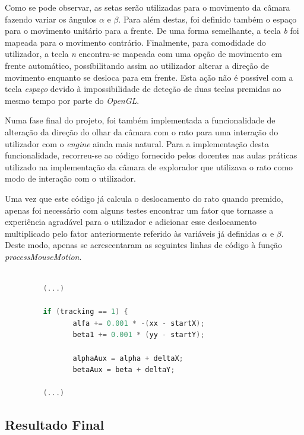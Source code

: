 \documentclass[a4paper]{article}
\begin{document}
Como se pode observar, as setas serão utilizadas para o movimento da câmara fazendo variar os ângulos $\alpha$ e $\beta$. Para além destas, foi definido também o espaço para o movimento unitário para a frente. De uma forma semelhante, a tecla \textit{b} foi mapeada para o movimento contrário. Finalmente, para comodidade do utilizador, a tecla \textit{n} encontra-se mapeada com uma opção de movimento em frente automático, possíbilitando assim ao utilizador alterar a direção de movimento enquanto se desloca para em frente. Esta ação não é possível com a tecla \textit{espaço} devido à impossibilidade de deteção de duas teclas premidas ao mesmo tempo por parte do \textit{OpenGL}.

Numa fase final do projeto, foi também implementada a funcionalidade de alteração da direção do olhar da câmara com o rato para uma interação do utilizador com o \textit{engine} ainda mais natural. Para a implementação desta funcionalidade, recorreu-se ao código fornecido pelos docentes nas aulas práticas utilizado na implementação da câmara de explorador que utilizava o rato como modo de interação com o utilizador.

Uma vez que este código já calcula o deslocamento do rato quando premido, apenas foi necessário com alguns testes encontrar um fator que tornasse a experiência agradável para o utilizador e adicionar esse deslocamento multiplicado pelo fator anteriormente referido às variáveis já definidas $\alpha$ e $\beta$. Deste modo, apenas se acrescentaram as seguintes linhas de código à função \textit{processMouseMotion}.

\begin{lstlisting}[language=C++, caption=Alterações na função \textit{processMouseMotion}.]
 
         (...)

         if (tracking == 1) {
                alfa += 0.001 * -(xx - startX);
                beta1 += 0.001 * (yy - startY);

                alphaAux = alpha + deltaX;
                betaAux = beta + deltaY;

         (...)

\end{lstlisting}




\subsection{Resultado Final} %
\end{document}
